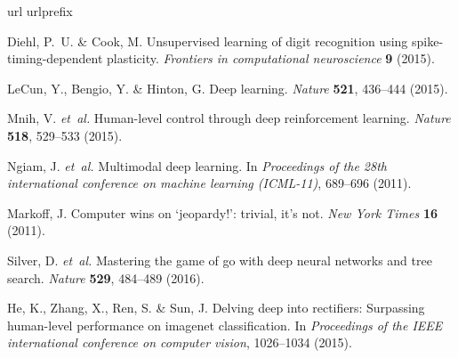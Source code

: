 \documentclass[journal, onecolumn]{IEEEtran}
\begin{document}
\begin{thebibliography}{10}
\expandafter\ifx\csname url\endcsname\relax
  \def\url#1{\texttt{#1}}\fi
\expandafter\ifx\csname urlprefix\endcsname\relax\def\urlprefix{URL }\fi
\providecommand{\bibinfo}[2]{#2}
\providecommand{\eprint}[2][]{\url{#2}}

\bibinfo{author}{Diehl, P.~U.} \& \bibinfo{author}{Cook, M.}
\newblock \bibinfo{title}{Unsupervised learning of digit recognition using
  spike-timing-dependent plasticity}.
\newblock \emph{\bibinfo{journal}{Frontiers in computational neuroscience}}
  \textbf{\bibinfo{volume}{9}} (\bibinfo{year}{2015}).

\bibinfo{author}{LeCun, Y.}, \bibinfo{author}{Bengio, Y.} \&
  \bibinfo{author}{Hinton, G.}
\newblock \bibinfo{title}{Deep learning}.
\newblock \emph{\bibinfo{journal}{Nature}} \textbf{\bibinfo{volume}{521}},
  \bibinfo{pages}{436--444} (\bibinfo{year}{2015}).

\bibinfo{author}{Mnih, V.} \emph{et~al.}
\newblock \bibinfo{title}{Human-level control through deep reinforcement
  learning}.
\newblock \emph{\bibinfo{journal}{Nature}} \textbf{\bibinfo{volume}{518}},
  \bibinfo{pages}{529--533} (\bibinfo{year}{2015}).

\bibinfo{author}{Ngiam, J.} \emph{et~al.}
\newblock \bibinfo{title}{Multimodal deep learning}.
\newblock In \emph{\bibinfo{booktitle}{Proceedings of the 28th international
  conference on machine learning (ICML-11)}}, \bibinfo{pages}{689--696}
  (\bibinfo{year}{2011}).

\bibinfo{author}{Markoff, J.}
\newblock \bibinfo{title}{Computer wins on ‘jeopardy!’: trivial, it’s
  not}.
\newblock \emph{\bibinfo{journal}{New York Times}}
  \textbf{\bibinfo{volume}{16}} (\bibinfo{year}{2011}).

\bibinfo{author}{Silver, D.} \emph{et~al.}
\newblock \bibinfo{title}{Mastering the game of go with deep neural networks
  and tree search}.
\newblock \emph{\bibinfo{journal}{Nature}} \textbf{\bibinfo{volume}{529}},
  \bibinfo{pages}{484--489} (\bibinfo{year}{2016}).

\bibinfo{author}{He, K.}, \bibinfo{author}{Zhang, X.}, \bibinfo{author}{Ren,
  S.} \& \bibinfo{author}{Sun, J.}
\newblock \bibinfo{title}{Delving deep into rectifiers: Surpassing human-level
  performance on imagenet classification}.
\newblock In \emph{\bibinfo{booktitle}{Proceedings of the IEEE international
  conference on computer vision}}, \bibinfo{pages}{1026--1034}
  (\bibinfo{year}{2015}).


\end{thebibliography}
\end{document}
